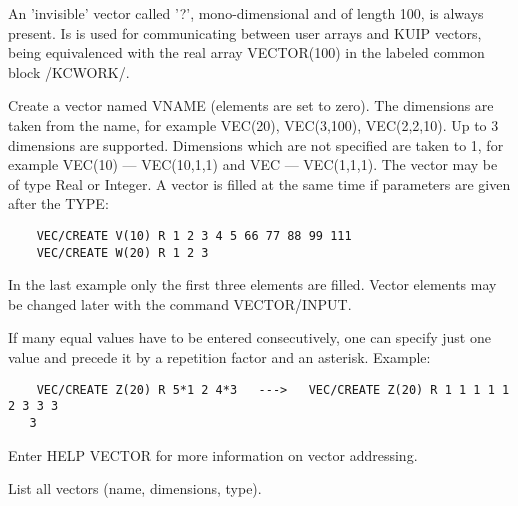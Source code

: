    \par
An 'invisible' vector called '?', mono-dimensional and of length 100, is 
   always present. Is is used for communicating between user arrays and KUIP 
   vectors, being equivalenced with the real array VECTOR(100) in the labeled 
   common block /KCWORK/.  


\fi


\BEGARG
{}
\ENDARG
{}
\ENDOPT

   \par
Create a vector named VNAME (elements are set to zero).  The dimensions are 
   taken from the name, for example VEC(20), VEC(3,100), VEC(2,2,10).  Up to 3 
   dimensions are supported. Dimensions which are not specified are taken to 
   1, for example VEC(10) ---\KET{} VEC(10,1,1) and VEC ---\KET{} VEC(1,1,1).  
   The vector may be of type Real or Integer.  A vector is filled at the same 
   time if parameters are given after the TYPE:  
\begin{verbatim}
    VEC/CREATE V(10) R 1 2 3 4 5 66 77 88 99 111
    VEC/CREATE W(20) R 1 2 3
\end{verbatim}
   \par
In the last example only the first three elements are filled.  Vector 
   elements may be changed later with the command VECTOR/INPUT.  

   \par
If many equal values have to be entered consecutively, one can specify just 
   one value and precede it by a repetition factor and an asterisk. Example:  
\begin{verbatim}
    VEC/CREATE Z(20) R 5*1 2 4*3   --->   VEC/CREATE Z(20) R 1 1 1 1 1 2 3 3 3 
   3
\end{verbatim}
   \par
Enter HELP VECTOR for more information on vector addressing.  

\ENDCMD


   \par
List all vectors (name, dimensions, type).  

\ENDCMD


\BEGARG
{}
\ENDARG


